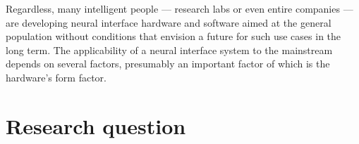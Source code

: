 Regardless, many intelligent people — research labs or even entire companies — are developing neural interface hardware and software aimed at the general population without conditions that envision a future for such use cases in the long term. The applicability of a neural interface system to the mainstream depends on several factors, presumably an important factor of which is the hardware's form factor.


\section{Research question}
\label{chapter1-research-question}


